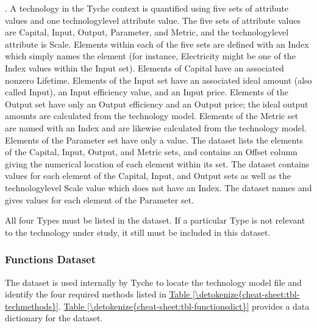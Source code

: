 \documentclass[letterpaper,10pt,english]{sphinxmanual}
\begin{document}
\sphinxAtStartPar
{}. A technology in the Tyche context is quantified using five sets of attribute values and one technology\sphinxhyphen{}level attribute value. The five sets of attribute values are Capital, Input, Output, Parameter, and Metric, and the technology\sphinxhyphen{}level attribute is Scale. Elements within each of the five sets are defined with an Index which simply names the element (for instance, Electricity might be one of the Index values within the Input set). Elements of Capital have an associated non\sphinxhyphen{}zero Lifetime. Elements of the Input set have an associated ideal amount (also called Input), an Input efficiency value, and an Input price. Elements of the Output set have only an Output efficiency and an Output price; the ideal output amounts are calculated from the technology model. Elements of the Metric set are named with an Index and are likewise calculated from the technology model. Elements of the Parameter set have only a value. The  dataset lists the elements of the Capital, Input, Output, and Metric sets, and contains an Offset column giving the numerical location of each element within its set. The  dataset contains values for each element of the Capital, Input, and Output sets as well as the technology\sphinxhyphen{}level Scale value which does not have an Index. The  dataset names and gives values for each element of the Parameter set.

\sphinxAtStartPar
{} All four Types must be listed in the  dataset. If a particular Type is not relevant to the technology under study, it still must be included in this dataset.


\subsubsection{Functions Dataset}
\label{\detokenize{cheat-sheet:functions-dataset}}
\sphinxAtStartPar
The  dataset is used internally by Tyche to locate the technology model file and identify the four required methods listed in \hyperref[\detokenize{cheat-sheet:tbl-techmethods}]{Table \ref{\detokenize{cheat-sheet:tbl-techmethods}}}. \hyperref[\detokenize{cheat-sheet:tbl-functionsdict}]{Table \ref{\detokenize{cheat-sheet:tbl-functionsdict}}} provides a data dictionary for the  dataset.
\end{document}
